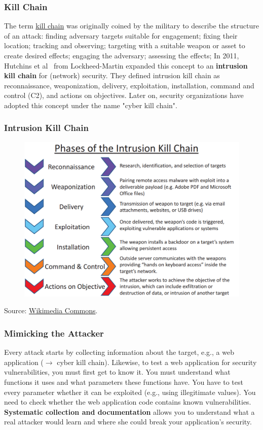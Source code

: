 \documentclass[aspectratio=169]{beamer}
\begin{document}
\begin{frame}
    \frametitle{Kill Chain}
    The term \href{https://en.wikipedia.org/wiki/Kill_chain}{kill chain} was originally coined by the military to describe the structure of an attack: finding adversary targets suitable for engagement; fixing their location; tracking and observing; targeting with a suitable weapon or asset to create desired effects; engaging the adversary; assessing the effects;
    \vfill
    In 2011, Hutchins et al~\cite{hutchins2011intelligence} from Lockheed-Martin expanded this concept to an \textbf{intrusion kill chain} for (network) security. They defined intrusion kill chain as reconnaissance, weaponization, delivery, exploitation, installation, command and control (C2), and actions on objectives. 
    \vfill
    Later on, security organizations have adopted this concept under the name "cyber kill chain".
\end{frame}

\begin{frame}
    \frametitle{Intrusion Kill Chain}
    \begin{figure}
        \includegraphics[scale=.35]{img/intrusion-kill-chain.png}
    \end{figure}
    \vfill
    Source: \href{https://commons.wikimedia.org/wiki/File:Intrusion_Kill_Chain_-_v2.png}{Wikimedia Commons}.
\end{frame}

\begin{frame}
    \frametitle{Mimicking the Attacker}
    Every attack starts by collecting information about the target, e.g., a web application ($\rightarrow$ cyber kill chain).
    \vfill
    Likewise, to test a web application for security vulnerabilities, you must first get to know it. You must understand what functions it uses and what parameters these functions have. You have to test every parameter whether it can be exploited (e.g., using illegitimate values). You need to check whether the web application code contains known vulnerabilities.
    \vfill
    \textbf{Systematic collection and documentation} allows you to understand what a real attacker would learn and where she could break your application's security.
\end{frame}
\end{document}
